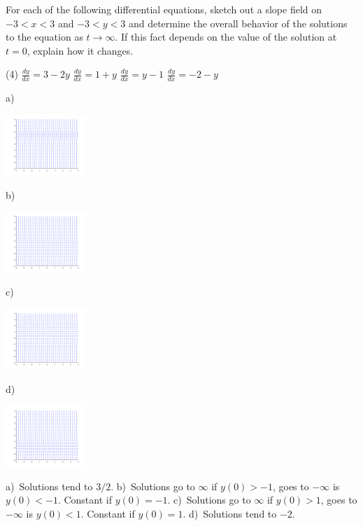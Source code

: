 \begin{exercise}
For each of the following differential equations, sketch out a slope field on $-3 < x < 3$ and $-3 < y < 3$ and determine the overall behavior of the solutions to the equation as $t \rightarrow \infty$. If this fact depends on the value of the solution at $t=0$, explain how it changes.
\begin{tasks}(4)
\task $\displaystyle \frac{dy}{dx} = 3 - 2y$
\task $\displaystyle \frac{dy}{dx} = 1 + y$
\task $\displaystyle \frac{dy}{dx} = y - 1$
\task $\displaystyle \frac{dy}{dx} = -2 - y$
\end{tasks}
\end{exercise}
\comboSol{%
}
{%
a)~\parbox[c]{1.2in}{\includegraphics[width=1.2in]{Images/slopefield3m2y.png}} \quad b)~\parbox[c]{1.2in}{\includegraphics[width=1.2in]{Images/slopefield1py.png}} \quad c)~\parbox[c]{1.2in}{\includegraphics[width=1.2in]{Images/slopefieldym1.png}} \quad d)~\parbox[c]{1.2in}{\includegraphics[width=1.2in]{Images/slopefieldm2my.png}}

a)~Solutions tend to $3/2$.
b)~Solutions go to $\infty$ if $y(0) > -1$, goes to $-\infty$ is $y(0) < -1$. Constant if $y(0) = -1$. 
c)~Solutions go to $\infty$ if $y(0) > 1$, goes to $-\infty$ is $y(0) < 1$. Constant if $y(0) = 1$. 
d)~Solutions tend to $-2$.
}

